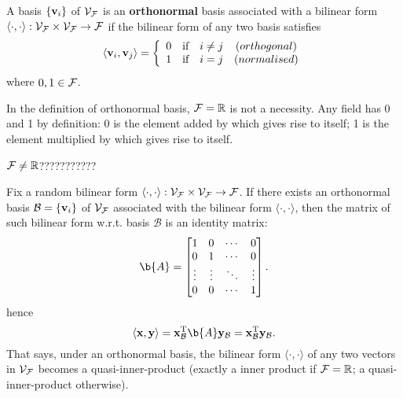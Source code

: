 \begin{definition}
A basis $\{\mathbf{v}_i\}$ of $\mathcal{V}_{\mathcal{F}}$ is an \textbf{orthonormal} basis associated with a bilinear form $\langle \cdot, \cdot \rangle: \mathcal{V}_{\mathcal{F}} \times \mathcal{V}_{\mathcal{F}} \to {\mathcal{F}}$ if the bilinear form of any two basis satisfies
%
\begin{equation*}
    \langle \mathbf{v}_i, \mathbf{v}_j \rangle = 
    \left\{ 
    \begin{array}{cccc}
    0 &  \mbox{if}  & i \neq j & (orthogonal) \\
    1 &  \mbox{if}  & i=j & (normalised)
    \end{array}
    \right.
\end{equation*}
%
where $0,1 \in {\mathcal{F}}$.\\
%
\end{definition}
%
\begin{remark}
In the definition of orthonormal basis, ${\mathcal{F}}= \mathbb{R}$ is not a necessity.
Any field has 0 and 1 by definition: 0 is the element added by which gives rise to itself; 1 is the element multiplied by which gives rise to itself. 
\end{remark}
%
\begin{example}
    ${\mathcal{F}} \neq \mathbb{R}$???????????
\end{example}
%
\begin{remark}
Fix a random bilinear form $\langle \cdot, \cdot \rangle: \mathcal{V}_{\mathcal{F}} \times \mathcal{V}_{\mathcal{F}} \to {\mathcal{F}}$.
If there exists an orthonormal basis $\mathcal{B} = \{\mathbf{v}_i\}$ of $\mathcal{V}_{\mathcal{F}}$ associated with the bilinear form $\langle \cdot, \cdot \rangle$, then the matrix of such bilinear form w.r.t. basis $\mathcal{B}$ is an identity matrix:
%
$$\b{A} =
    \begin{bmatrix}
        1        &0       &\cdots   &0\\
        0        &1       &\cdots   &0\\
        \vdots   &\vdots  &\ddots   &\vdots\\
        0        &0       &\cdots   &1
    \end{bmatrix}.$$
%
hence
%
\begin{equation*}
 \langle \x, \y \rangle = \x^\T_{\mathcal{B}} \b{A} \y_{\mathcal{B}} = \x^\T_{\mathcal{B}} \y_{\mathcal{B}}.
\end{equation*}
%
That says, under an orthonormal basis, the bilinear form $\langle \cdot, \cdot \rangle$ of any two vectors in $\mathcal{V}_{\mathcal{F}}$ becomes a quasi-inner-product (exactly a inner product if ${\mathcal{F}} = \mathbb{R}$; a quasi-inner-product otherwise).
%
\end{remark}
%
